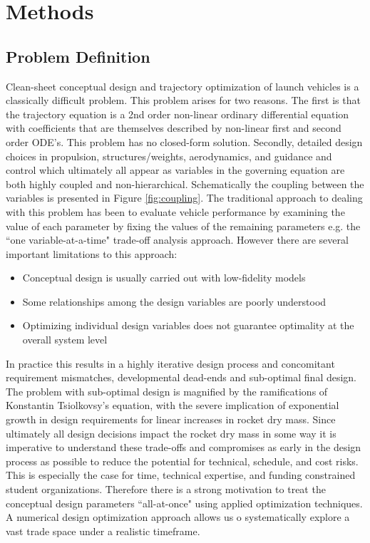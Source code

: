 \documentclass[]{aiaa-tc}%
\begin{document}
\section{Methods}
\subsection{Problem Definition}
Clean-sheet conceptual design and trajectory optimization of launch vehicles is a classically difficult problem. This problem arises for two reasons. The first is that the trajectory equation is a 2nd order non-linear ordinary differential equation with coefficients that are themselves described by non-linear first and second order ODE's. This problem has no closed-form solution. Secondly, detailed design choices in propulsion, structures/weights, aerodynamics, and guidance and control which ultimately all appear as variables in the governing equation are both highly coupled and non-hierarchical. Schematically the coupling between the variables is presented in Figure \ref{fig:coupling}. The traditional approach to dealing with this problem has been to evaluate vehicle performance by examining the value of each parameter by fixing the values of the remaining parameters e.g. the ``one variable-at-a-time" trade-off analysis approach. However there are several important limitations to this approach:
\begin{itemize}
\item Conceptual design is usually carried out with low-fidelity models
\item Some relationships among the design variables are poorly understood
\item Optimizing individual design variables does not guarantee optimality at the overall system level
\end{itemize}

In practice this results in a highly iterative design process and concomitant requirement mismatches, developmental dead-ends and sub-optimal final design. The problem with sub-optimal design is magnified by the ramifications of Konstantin Tsiolkovsy's equation, with the severe implication of exponential growth in design requirements for linear increases in rocket dry mass. Since ultimately all design decisions impact the rocket dry mass in some way it is imperative to understand these trade-offs and compromises as early in the design process as possible to reduce the potential for technical, schedule, and cost risks. This is especially the case for time, technical expertise, and funding constrained student organizations. Therefore there is a strong motivation to treat the conceptual design parameters ``all-at-once" using applied optimization techniques. A numerical design optimization approach allows us o systematically explore a vast trade space under a realistic timeframe.
\end{document}
